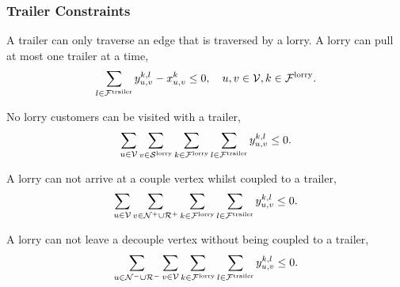 \subsubsection{Trailer Constraints}

A trailer can only traverse an edge that is traversed by a lorry.
A lorry can pull at most one trailer at a time,
\begin{align}
  \sum_{l \in \mathcal F^{\rm trailer}} y^{k,l}_{u,v} - x_{u,v}^k \leq 0, \quad u,v \in \mathcal V, k \in \mathcal{F}^{\rm lorry}.
\end{align}



No lorry customers can be visited with a trailer,
\begin{align}
  \label{eq:lorrycustomer}
  \sum_{u \in \mathcal V}
  \sum_{v \in \mathcal S^{\rm lorry} }
  \sum_{k \in \mathcal F^{\rm lorry} }
  \sum_{l \in \mathcal F^{\rm trailer} }
   y^{k,l}_{u,v}  \leq 0 .
\end{align}


A lorry can not arrive at a couple vertex whilst coupled to a trailer,
\begin{align}
  \sum_{u \in \mathcal V}
  \sum_{v \in \mathcal N^+ \cup \mathcal R^+ }
  \sum_{k \in \mathcal F^{\rm lorry} }
  \sum_{l \in \mathcal F^{\rm trailer} }
   y^{k,l}_{u,v}  \leq 0 .
\end{align}

A lorry can not leave  a decouple vertex without being coupled to a trailer,
\begin{align}
  \sum_{u \in \mathcal N^- \cup \mathcal R^- }
  \sum_{v \in \mathcal V}
  \sum_{k \in \mathcal F^{\rm lorry} }
  \sum_{l \in \mathcal F^{\rm trailer} }
   y^{k,l}_{u,v}  \leq 0 .
\end{align}


